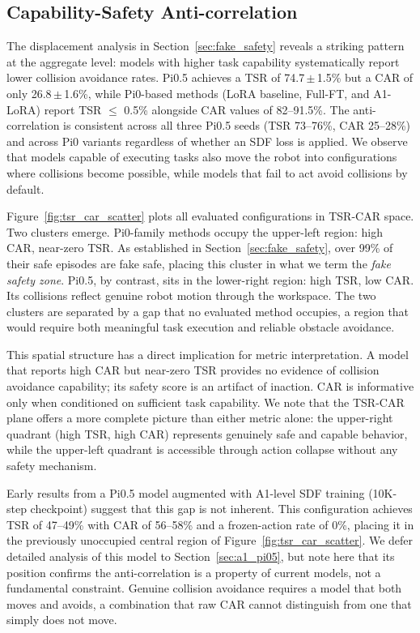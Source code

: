 \subsection{Capability-Safety Anti-correlation}\label{sec:tsr_car}

The displacement analysis in Section~\ref{sec:fake_safety} reveals a striking pattern at the aggregate level: models with higher task capability systematically report lower collision avoidance rates. Pi0.5 achieves a TSR of 74.7\,$\pm$\,1.5\% but a CAR of only 26.8\,$\pm$\,1.6\%, while Pi0-based methods (LoRA baseline, Full-FT, and A1-LoRA) report TSR $\leq$ 0.5\% alongside CAR values of 82--91.5\%. The anti-correlation is consistent across all three Pi0.5 seeds (TSR 73--76\%, CAR 25--28\%) and across Pi0 variants regardless of whether an SDF loss is applied. We observe that models capable of executing tasks also move the robot into configurations where collisions become possible, while models that fail to act avoid collisions by default.

Figure~\ref{fig:tsr_car_scatter} plots all evaluated configurations in TSR-CAR space. Two clusters emerge. Pi0-family methods occupy the upper-left region: high CAR, near-zero TSR. As established in Section~\ref{sec:fake_safety}, over 99\% of their safe episodes are fake safe, placing this cluster in what we term the \emph{fake safety zone}. Pi0.5, by contrast, sits in the lower-right region: high TSR, low CAR. Its collisions reflect genuine robot motion through the workspace. The two clusters are separated by a gap that no evaluated method occupies, a region that would require both meaningful task execution and reliable obstacle avoidance.

This spatial structure has a direct implication for metric interpretation. A model that reports high CAR but near-zero TSR provides no evidence of collision avoidance capability; its safety score is an artifact of inaction. CAR is informative only when conditioned on sufficient task capability. We note that the TSR-CAR plane offers a more complete picture than either metric alone: the upper-right quadrant (high TSR, high CAR) represents genuinely safe and capable behavior, while the upper-left quadrant is accessible through action collapse without any safety mechanism.

Early results from a Pi0.5 model augmented with A1-level SDF training (10K-step checkpoint) suggest that this gap is not inherent. This configuration achieves TSR of 47--49\% with CAR of 56--58\% and a frozen-action rate of 0\%, placing it in the previously unoccupied central region of Figure~\ref{fig:tsr_car_scatter}. We defer detailed analysis of this model to Section~\ref{sec:a1_pi05}, but note here that its position confirms the anti-correlation is a property of current models, not a fundamental constraint. Genuine collision avoidance requires a model that both moves and avoids, a combination that raw CAR cannot distinguish from one that simply does not move.
